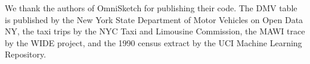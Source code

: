 \begin{acks}
We thank the authors of OmniSketch for publishing their code. The DMV table is published by the New York
State Department of Motor Vehicles on Open Data NY, the taxi trips by the NYC Taxi and Limousine
Commission, the MAWI trace by the WIDE project, and the 1990 census extract by the UCI Machine Learning
Repository.
\end{acks}
